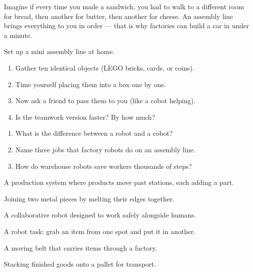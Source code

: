 \sectionrule

\begin{picturethis}
  Imagine if every time you made a sandwich, you had to walk to a
  different room for bread, then another for butter, then another for
  cheese. An assembly line brings everything to you in order ---
  that is why factories can build a car in under a minute.
\end{picturethis}

\sectionrule

\begin{tryit}
  Set up a mini assembly line at home.
  \begin{enumerate}
    \item Gather ten identical objects (LEGO bricks, cards, or coins).
    \item Time yourself placing them into a box one by one.
    \item Now ask a friend to pass them to you (like a cobot helping).
    \item Is the teamwork version faster? By how much?
  \end{enumerate}
\end{tryit}

\sectionrule


\begin{quickcheck}
  \begin{enumerate}
    \item What is the difference between a robot and a cobot?
    \item Name three jobs that factory robots do on an assembly line.
    \item How do warehouse robots save workers thousands of steps?
  \end{enumerate}
\end{quickcheck}

\sectionrule
\begin{newwords}
  \begin{description}[labelwidth=3.8cm, leftmargin=4.0cm]
    \item[Assembly line] A production system where products move past stations, each adding a part.
    \item[Welding] Joining two metal pieces by melting their edges together.
    \item[Cobot] A collaborative robot designed to work safely alongside humans.
    \item[Pick and place] A robot task: grab an item from one spot and put it in another.
    \item[Conveyor belt] A moving belt that carries items through a factory.
    \item[Palletising] Stacking finished goods onto a pallet for transport.
  \end{description}
\end{newwords}
